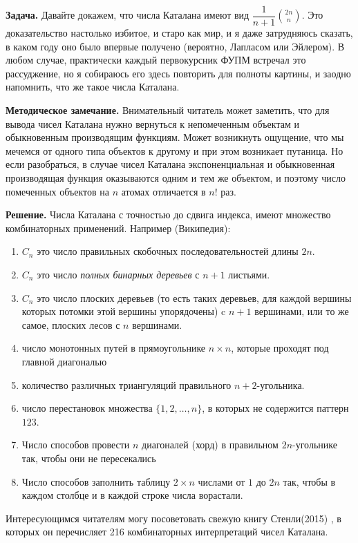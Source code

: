 \documentclass{article}
\theoremstyle{definition}
\begin{document}
\textbf{Задача.} Давайте докажем, что числа Каталана имеют вид \( 
\dfrac{1}{n+1}{2n \choose n} \). Это доказательство настолько избитое, и старо 
как мир, и я даже затрудняюсь сказать, в каком году оно было впервые получено 
(вероятно, Лапласом или Эйлером). В любом случае, практически каждый 
первокурсник ФУПМ встречал это рассуджение, но я собираюсь его здесь повторить 
для полноты картины, и заодно напомнить, что же такое числа Каталана.

\textbf{Методическое замечание.} Внимательный читатель может заметить, что для 
вывода чисел Каталана нужно вернуться к непомеченным объектам и обыкновенным 
производящим функциям. Может возникнуть ощущение, что мы мечемся от одного типа 
объектов к другому и при этом возникает путаница. Но если разобраться, в случае 
чисел Каталана экспоненциальная и обыкновенная производящая функция оказываются 
одним и тем же объектом, и поэтому число помеченных объектов на \( n \) атомах 
отличается в \( n! \) раз.

\textbf{Решение.} Числа Каталана с точностью до сдвига индекса, имеют множество 
комбинаторных применений. Например (Википедия):
\begin{enumerate}
	\item \( C_n \) это число правильных скобочных последовательностей длины \( 
	2n \).
	\item \( C_n \) это число \textit{полных бинарных деревьев} с \( n + 1 \) 
	листьями.
	\item \( C_n \) это число плоских деревьев (то есть таких деревьев, для 
	каждой вершины которых потомки этой вершины упорядочены) c \( n + 1 \) 
	вершинами, или то же самое, плоских лесов с \( n \) вершинами.
	\item число монотонных путей в прямоугольнике \( n \times n \), которые 
	проходят под главной диагональю
	\item количество различных триангуляций правильного \( n+2 \)-угольника.
	\item число перестановок множества \( \{ 1, 2, \ldots, n \} \), в которых 
	не содержится паттерн \( 123 \).
	\item Число способов провести \( n \) диагоналей (хорд) в правильном \( 2n 
	\)-угольнике так, чтобы они не пересекались
	\item Число способов заполнить таблицу \( 2 \times n \) числами от \( 1 \) 
	до \( 2n \) так, чтобы в каждом столбце и в каждой строке числа ворастали.
\end{enumerate}
Интересующимся читателям могу посоветовать свежую книгу Стенли(2015) 
\cite{stanleycatalan}, в которых он 
перечисляет 216 комбинаторных интерпретаций чисел Каталана.
\end{document}

